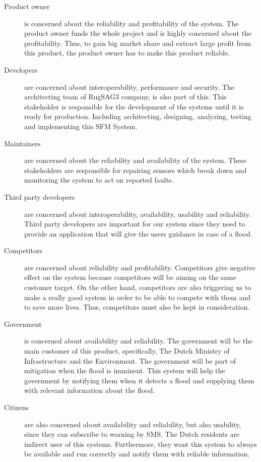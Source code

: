 \begin{description}
	\item[Product owner] is concerned about the reliability and profitability of the system. The product owner funds the whole project and is highly concerned about the profitability. Thus, to gain big market share and extract large profit from this product, the product owner has to make this product reliable.
			 
	\item[Developers] are concerned about interoperability, performance and security. The architecting team of RugSAG3 company, is also part of this. This stakeholder is responsible for the development of the systems until it is ready for production. Including architecting, designing, analyzing, testing and implementing this SFM System.
	
	\item[Maintainers] are concerned about the reliability and availability of the system. These stakeholders are responsible for repairing sensors which break down and monitoring the system to act on reported faults.
			
	\item[Third party developers] are concerned about interoperability, availability, usability and reliability. Third party developers are important for our system since they need to provide an application that will give the users guidance in case of a flood.
			
	\item[Competitors] are concerned about reliability and profitability. Competitors give negative effect on the system because competitors will be aiming on the same customer target. On the other hand, competitors are also triggering us to make a really good system in order to be able to compete with them and to save more lives. Thus, competitors must also be kept in consideration.
			
	\item[Government] is concerned about availability and reliability. The government will be the main customer of this product, specifically, The Dutch Ministry of Infrastructure and the Environment. The government will be part of mitigation when the flood is imminent. This system will help the government by notifying them when it detects a flood and supplying them with relevant information about the flood.
			
	\item[Citizens] are also concerned about availability and reliability, but also usability, since they can subscribe to warning by SMS. The Dutch residents are indirect user of this systems. Furthermore, they want this system to always be available and run correctly and notify them with reliable information.
			

\end{description}
